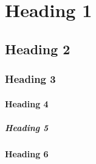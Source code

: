 \documentclass{article}
\begin{document}
\section{Heading 1}
\subsection{Heading 2}
\subsubsection{Heading 3}
\paragraph{Heading 4}
\subparagraph{Heading 5}
\textbf{Heading 6}\par
\end{document}
